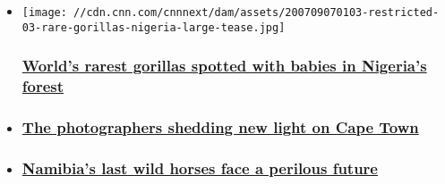 \begin{itemize}
\item
  \href{/2020/07/09/africa/rare-gorillas-nigeria-scn/index.html}{}

  \texttt{[image: //cdn.cnn.com/cnnnext/dam/assets/200709070103-restricted-03-rare-gorillas-nigeria-large-tease.jpg]}

  \hypertarget{worlds-rarest-gorillas-spotted-with-babies-in-nigerias-forest}{%
  \subsubsection{\texorpdfstring{\href{/2020/07/09/africa/rare-gorillas-nigeria-scn/index.html}{World's
  rarest gorillas spotted with babies in Nigeria's
  forest}}{World's rarest gorillas spotted with babies in Nigeria's forest}}\label{worlds-rarest-gorillas-spotted-with-babies-in-nigerias-forest}}
\item
  \hypertarget{-the-photographers-shedding-new-light-on-cape-town}{%
  \subsubsection{\texorpdfstring{\href{/travel/article/cape-town-photography-unfiltered-spc-intl/index.html}{
  The photographers shedding new light on Cape
  Town}}{ The photographers shedding new light on Cape Town}}\label{-the-photographers-shedding-new-light-on-cape-town}}
\item
  \hypertarget{namibias-last-wild-horses-face-a-perilous-future}{%
  \subsubsection{\texorpdfstring{\href{/travel/article/namibia-wild-horses-spc-intl/index.html}{Namibia's
  last wild horses face a perilous
  future}}{Namibia's last wild horses face a perilous future}}\label{namibias-last-wild-horses-face-a-perilous-future}}
\end{itemize}

